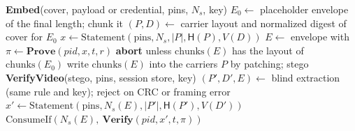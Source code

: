 \documentclass[journal]{IEEEtran}
\newcommand{\Hash}{\mathsf{H}}
\newcommand{\pid}{\mathit{pid}}
\begin{document}
\begin{algorithm}[t]
\caption{Nhúng và kiểm chứng ở mức video.}
\label{alg:video}
\small
\begin{algorithmic}[1]
\Statex \textbf{Embed}(cover, payload or credential, pins, $N_s$, key)
\State $E_0\gets$ placeholder envelope of the final length; chunk it
\State $(P, D)\gets$ carrier layout and normalized digest of cover for $E_0$
\State $x\gets\mathrm{Statement}(\text{pins}, N_s, |P|, \Hash(P), V(D))$
\State $E\gets$ envelope with $\pi\gets\textbf{Prove}(\pid, x, t, r)$
\State \textbf{abort} unless $\mathrm{chunks}(E)$ has the layout of $\mathrm{chunks}(E_0)$
\State write $\mathrm{chunks}(E)$ into the carriers $P$ by patching; \Return stego
\Statex
\Statex \textbf{VerifyVideo}(stego, pins, session store, key)
\State $(P', D', E)\gets$ blind extraction (same rule and key); reject on CRC
  or framing error
\State $x'\gets\mathrm{Statement}(\text{pins}, N_s(E), |P'|, \Hash(P'), V(D'))$
\State \Return $\mathrm{ConsumeIf}(N_s(E),\ \textbf{Verify}(\pid, x', t, \pi))$
\end{algorithmic}
\end{algorithm}
\end{document}
